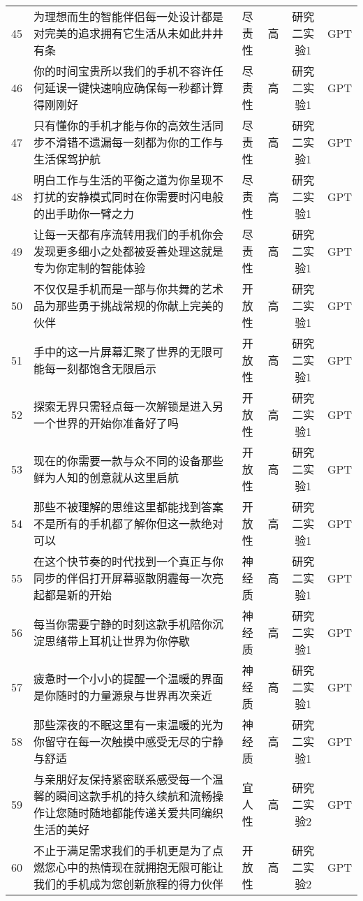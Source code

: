 {\begin{longtable}{c p{8cm} c c c c}
        45 & 为理想而生的智能伴侣每一处设计都是对完美的追求拥有它生活从未如此井井有条 & 尽责性 & 高 & 研究二实验1 & GPT \\
        46 & 你的时间宝贵所以我们的手机不容许任何延误一键快速响应确保每一秒都计算得刚刚好 & 尽责性 & 高 & 研究二实验1 & GPT \\
        47 & 只有懂你的手机才能与你的高效生活同步不滑错不遗漏每一刻都为你的工作与生活保驾护航 & 尽责性 & 高 & 研究二实验1 & GPT \\
        48 & 明白工作与生活的平衡之道为你呈现不打扰的安静模式同时在你需要时闪电般的出手助你一臂之力 & 尽责性 & 高 & 研究二实验1 & GPT \\
        49 & 让每一天都有序流转用我们的手机你会发现更多细小之处都被妥善处理这就是专为你定制的智能体验 & 尽责性 & 高 & 研究二实验1 & GPT \\
        50 & 不仅仅是手机而是一部与你共舞的艺术品为那些勇于挑战常规的你献上完美的伙伴 & 开放性 & 高 & 研究二实验1 & GPT \\
        51 & 手中的这一片屏幕汇聚了世界的无限可能每一刻都饱含无限启示 & 开放性 & 高 & 研究二实验1 & GPT \\
        52 & 探索无界只需轻点每一次解锁是进入另一个世界的开始你准备好了吗 & 开放性 & 高 & 研究二实验1 & GPT \\
        53 & 现在的你需要一款与众不同的设备那些鲜为人知的创意就从这里启航 & 开放性 & 高 & 研究二实验1 & GPT \\
        54 & 那些不被理解的思维这里都能找到答案不是所有的手机都了解你但这一款绝对可以 & 开放性 & 高 & 研究二实验1 & GPT \\
        55 & 在这个快节奏的时代找到一个真正与你同步的伴侣打开屏幕驱散阴霾每一次亮起都是新的开始 & 神经质 & 高 & 研究二实验1 & GPT \\
        56 & 每当你需要宁静的时刻这款手机陪你沉淀思绪带上耳机让世界为你停歇 & 神经质 & 高 & 研究二实验1 & GPT \\
        57 & 疲惫时一个小小的提醒一个温暖的界面是你随时的力量源泉与世界再次亲近 & 神经质 & 高 & 研究二实验1 & GPT \\
        58 & 那些深夜的不眠这里有一束温暖的光为你留守在每一次触摸中感受无尽的宁静与舒适 & 神经质 & 高 & 研究二实验1 & GPT \\
        59 & 与亲朋好友保持紧密联系感受每一个温馨的瞬间这款手机的持久续航和流畅操作让您随时随地都能传递关爱共同编织生活的美好 & 宜人性 & 高 & 研究二实验2 & GPT \\
        60 & 不止于满足需求我们的手机更是为了点燃您心中的热情现在就拥抱无限可能让我们的手机成为您创新旅程的得力伙伴 & 开放性 & 高 & 研究二实验2 & GPT \\

\end{longtable}}
